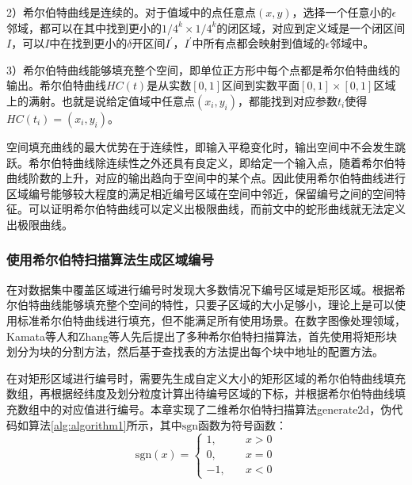 \documentclass[master]{thesis-uestc}
\begin{document}
2）希尔伯特曲线是连续的。对于值域中的点任意点$(x,y)$，选择一个任意小的$\epsilon$邻域，都可以在其中找到更小的$1/4^k \times 1/4^k$的闭区域，对应到定义域是一个闭区间$I$，可以$I$中在找到更小的$\delta$开区间$I^{\prime}$，$I^{\prime}$中所有点都会映射到值域的$\epsilon$邻域中。

3）希尔伯特曲线能够填充整个空间，即单位正方形中每个点都是希尔伯特曲线的输出。希尔伯特曲线$HC(t)$是从实数$[0,1]$区间到实数平面$[0,1]\times [0,1]$区域上的满射。也就是说给定值域中任意点$(x_i,y_i)$，都能找到对应参数$t_i$使得$HC(t_i)=(x_i,y_i)$。

空间填充曲线的最大优势在于连续性，即输入平稳变化时，输出空间中不会发生跳跃。希尔伯特曲线除连续性之外还具有良定义，即给定一个输入点，随着希尔伯特曲线阶数的上升，对应的输出趋向于空间中的某个点。因此使用希尔伯特曲线进行区域编号能够较大程度的满足相近编号区域在空间中邻近，保留编号之间的空间特征。可以证明希尔伯特曲线可以定义出极限曲线，而前文中的蛇形曲线就无法定义出极限曲线。

\subsubsection{使用希尔伯特扫描算法生成区域编号}
在对数据集中覆盖区域进行编号时发现大多数情况下编号区域是矩形区域。根据希尔伯特曲线能够填充整个空间的特性，只要子区域的大小足够小，理论上是可以使用标准希尔伯特曲线进行填充，但不能满足所有使用场景。在数字图像处理领域，Kamata等人和Zhang等人先后提出了多种希尔伯特扫描算法，首先使用将矩形块划分为块的分割方法，然后基于查找表的方法提出每个块中地址的配置方法。

在对矩形区域进行编号时，需要先生成自定义大小的矩形区域的希尔伯特曲线填充数组，再根据经纬度及划分粒度计算出待编号区域的下标，并根据希尔伯特曲线填充数组中的对应值进行编号。本章实现了二维希尔伯特扫描算法generate2d，伪代码如算法\ref{alg:algorithm1}所示，其中$\mathrm{sgn}$函数为符号函数：
\begin{equation}
\mathrm{sgn}(x)=
\begin{cases}
1,\quad &x>0\\
0,\quad &x=0\\
-1,\quad &x<0
\end{cases}
\end{equation}
\end{document}
